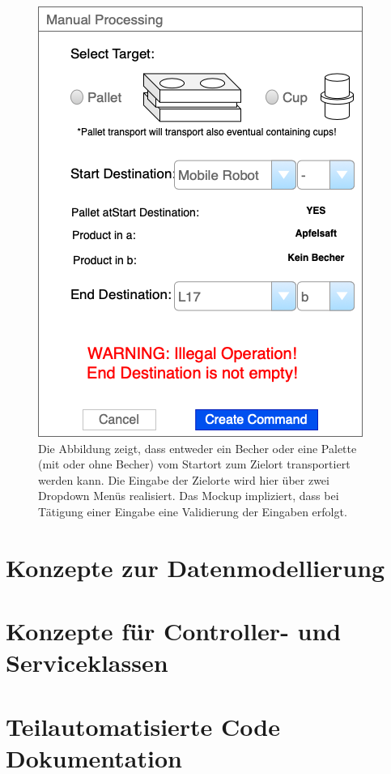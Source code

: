 \begin{figure}
        \caption[Mockup des Menüs für die Manuelle Lagersteuerung]
        {\small Die Abbildung zeigt, dass entweder ein Becher oder eine Palette (mit oder ohne Becher) vom Startort zum
        Zielort transportiert werden kann. Die Eingabe der Zielorte wird hier über zwei Dropdown Menüs realisiert.
        Das Mockup impliziert, dass bei Tätigung einer Eingabe eine Validierung der Eingaben erfolgt.
        }\label{fig:figure12}
        \includegraphics[width = \textwidth ]{Bilder/Mockup_ManualProcessing}
        \centering
\end{figure}


\section{Konzepte zur Datenmodellierung}

\section{Konzepte für Controller- und Serviceklassen}

\section{Teilautomatisierte Code Dokumentation}
